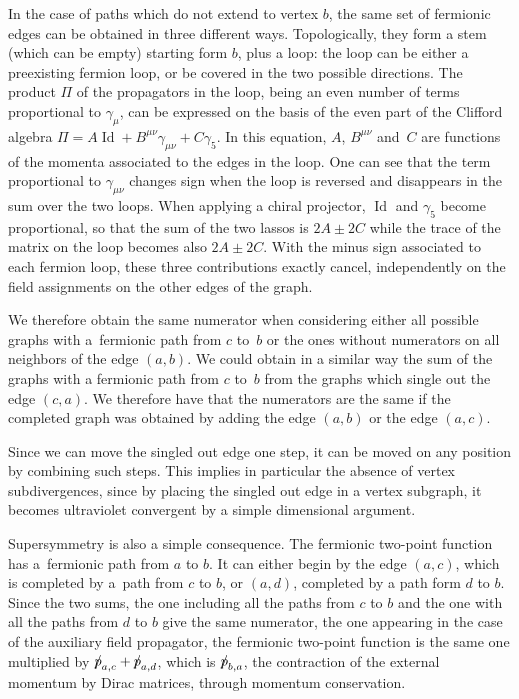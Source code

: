 \documentclass[pdftex]{sigma}
\numberwithin{equation}{section}
\def\dirp{{\slash \mkern -9mu p}}
\DeclareMathOperator{\id}{Id}
\begin{document}
In the case of paths which do not extend to vertex $b$, the same set of fermionic edges can be
obtained in three different ways. Topologically, they form a stem (which can be empty) starting
form $b$, plus a loop: the loop can be either a preexisting fermion loop, or be covered in the two
possible directions. The product $\Pi$ of the propagators in the loop, being an even number of
terms proportional to $\gamma_\mu$, can be expressed on the basis of the even part of the Clifford
algebra
$\Pi = A \id + B^{\mu\nu} \gamma_{\mu\nu} + C \gamma_5$.
In this equation, $A$, $B^{\mu\nu}$ and~$C$ are functions of the momenta associated to the
edges in the loop. One can see that the term proportional to $\gamma_{\mu\nu}$ changes sign when
the loop is reversed and disappears in the sum over the two loops. When applying a chiral
projector, $\id$ and $\gamma_5$ become proportional, so that the sum of the two lassos is $2 A
\pm 2 C$ while the trace of the matrix on the loop becomes also $2A \pm 2C$. With the minus sign
associated to each fermion loop, these three contributions exactly cancel, independently on the
field assignments on the other edges of the graph.

We therefore obtain the same numerator when considering either all possible graphs with a~fermionic path from
$c$ to~$b$ or the ones without numerators on all neighbors of the edge $(a,b)$. We could obtain in a
similar way the sum of the graphs with a fermionic path from $c$ to~$b$ from the graphs which single
out the edge $(c,a)$. We therefore have that the numerators are the same if the completed graph was
obtained by adding the edge $(a,b)$ or the edge $(a,c)$.

Since we can move the singled out edge one step, it can be moved on any position by combining such steps. This
implies in particular the absence of vertex subdivergences, since by placing the singled out edge in a vertex
subgraph, it becomes ultraviolet convergent by a simple dimensional argument.

Supersymmetry is also a simple consequence. The fermionic two-point function has a~fer\-mion\-ic path from $a$
to $b$. It can either begin by the edge $(a,c)$, which is completed by a~path from $c$ to $b$, or
$(a,d)$, completed by a path form $d$ to $b$. Since the two sums, the one including all the paths from $c$
to $b$ and the one with all the paths from $d$ to $b$ give the same numerator, the one appearing in the case of
the auxiliary field propagator, the fermionic two-point function is the same one multiplied by $\dirp_{a,c} +
\dirp_{a,d}$, which is $\dirp_{b,a}$, the contraction of the external momentum by Dirac matrices, through
momentum conservation.
\end{document}
